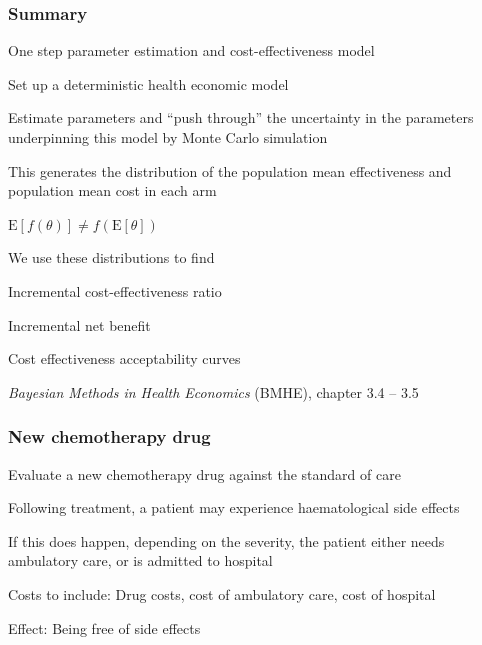 
\begin{frame}

\frametitle{Summary}

\bi

\item One step parameter estimation and cost-effectiveness model
\bi
\item Set up a deterministic health economic model
\item Estimate parameters and ``push through'' the uncertainty in the parameters underpinning this model by Monte Carlo simulation
\ei

\item  This generates the distribution of the population mean effectiveness and population mean cost in each arm
\bi
\item $\mbox{E}[f(\theta)] \neq f \left( \mbox{E}[\theta] \right) $
\ei

\item We use these distributions to find
\bi
\item Incremental cost-effectiveness ratio
\item Incremental net benefit
\item Cost effectiveness acceptability curves
\ei
\ei

\vfill
{\footnotesize  \emph{Bayesian Methods in Health Economics} (BMHE), chapter 3.4 -- 3.5}

\end{frame}



\begin{frame}

\frametitle{New chemotherapy drug}

\bi
\item Evaluate a new chemotherapy drug against the standard of care

\item Following treatment, a patient may experience haematological side effects

\item If this does happen, depending on the severity, the patient either needs ambulatory care, or is admitted to hospital

\item Costs to include: Drug costs, cost of ambulatory care, cost of hospital

\item Effect: Being free of side effects
\ei

\end{frame}

